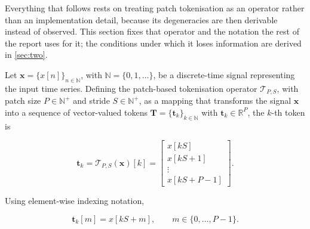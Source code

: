 Everything that follows rests on treating patch tokenisation as an operator rather than an implementation detail, because its degeneracies are then derivable instead of observed. This section fixes that operator and the notation the rest of the report uses for it; the conditions under which it loses information are derived in \autoref{sec:two}.

Let $\mathbf{x} = \{x[n]\}_{n \in \mathbb{N}}$, with $\mathbb{N}=\{0,1,\ldots\}$, be a discrete-time signal representing the input time series. Defining the patch-based tokenisation operator $\mathcal{T}_{P,S}$, with patch size $P \in \mathbb{N}^{+}$ and stride $S \in \mathbb{N}^{+}$, as a mapping that transforms the signal $\mathbf{x}$ into a sequence of vector-valued tokens $\mathbf{T}=\{\mathbf{t}_k\}_{k\in\mathbb{N}}$ with $\mathbf{t}_k\in\mathbb{R}^{P}$, the $k$-th token is

\begin{equation*}
\mathbf{t}_k
=
\mathcal{T}_{P,S}(\mathbf{x})[k]
=
\begin{bmatrix}
x[kS] \\
x[kS+1] \\
\vdots \\
x[kS+P-1]
\end{bmatrix}.
\end{equation*}

Using element-wise indexing notation,

\begin{equation}
\label{eq:element_def}
\mathbf{t}_k[m]
=
x[kS+m],
\qquad
m\in\{0,\ldots,P-1\}.
\end{equation}
